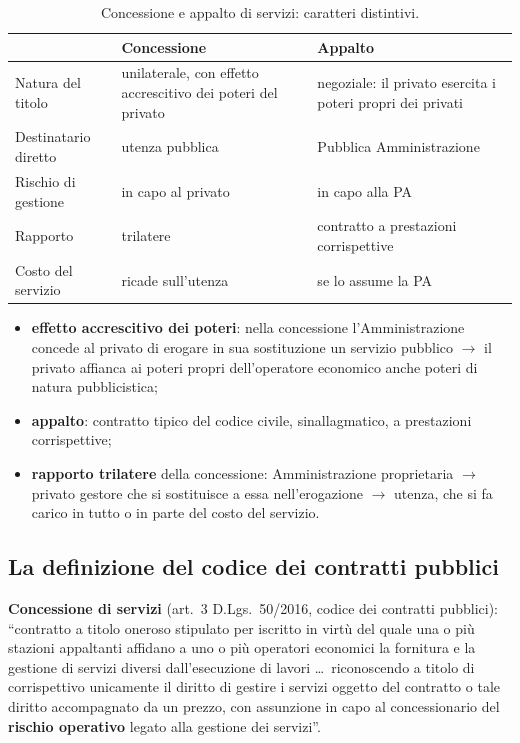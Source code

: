 \begin{table}[htbp]
  \centering \small \renewcommand{\arraystretch}{1.3}
  \begin{tabularx}{\textwidth}{|l|X|X|}
    \hline
    & \textbf{Concessione} & \textbf{Appalto} \\
    \hline
    Natura del titolo & unilaterale, con effetto accrescitivo dei poteri del privato & negoziale:
      il privato esercita i poteri propri dei privati \\
    \hline
    Destinatario diretto & utenza pubblica & Pubblica Amministrazione \\
    \hline
    Rischio di gestione & in capo al privato & in capo alla PA \\
    \hline
    Rapporto & trilatere & contratto a prestazioni corrispettive \\
    \hline
    Costo del servizio & ricade sull'utenza & se lo assume la PA \\
    \hline
  \end{tabularx}
  \caption{Concessione e appalto di servizi: caratteri distintivi.}
  \label{tab:concessione-appalto}
\end{table}

\begin{itemize}
  \item \textbf{effetto accrescitivo dei poteri}: nella concessione l'Amministrazione concede al
    privato di erogare in sua sostituzione un servizio pubblico $\rightarrow$ il privato affianca
    ai poteri propri dell'operatore economico anche poteri di natura pubblicistica;
  \item \textbf{appalto}: contratto tipico del codice civile, sinallagmatico, a prestazioni
    corrispettive;
  \item \textbf{rapporto trilatere} della concessione: Amministrazione proprietaria $\rightarrow$
    privato gestore che si sostituisce a essa nell'erogazione $\rightarrow$ utenza, che si fa
    carico in tutto o in parte del costo del servizio.
\end{itemize}

\subsection{La definizione del codice dei contratti pubblici}

\textbf{Concessione di servizi} (art.\ 3 D.Lgs.\ 50/2016, codice dei contratti pubblici):
``contratto a titolo oneroso stipulato per iscritto in virtù del quale una o più stazioni
appaltanti affidano a uno o più operatori economici la fornitura e la gestione di servizi diversi
dall'esecuzione di lavori \ldots\ riconoscendo a titolo di corrispettivo unicamente il diritto di
gestire i servizi oggetto del contratto o tale diritto accompagnato da un prezzo, con assunzione in
capo al concessionario del \textbf{rischio operativo} legato alla gestione dei servizi''.


